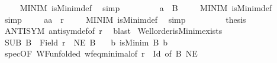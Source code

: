 \begin{isabellebody}
\ \ \ \isamarkupfalse%
\ MINIM{\isacharprime}{\kern0pt}\ isMinim{\isacharunderscore}{\kern0pt}def\ \isamarkupfalse%
\ simp\isanewline
\ \ \isacommand{{\isacharbraceright}{\kern0pt}}\isamarkupfalse%
\isanewline
\ \ \isamarkupfalse%
\isanewline
\ \ \isacommand{{\isacharbraceleft}{\kern0pt}}\isamarkupfalse%
\isamarkupfalse%
\ {\isachardoublequoteopen}a{\isacharprime}{\kern0pt}\ {\isasymin}\ B{\isachardoublequoteclose}\isanewline
\ \ \ \isamarkupfalse%
\ MINIM{\isacharprime}{\kern0pt}\ isMinim{\isacharunderscore}{\kern0pt}def\ \isamarkupfalse%
\ simp\isanewline
\ \ \ \isamarkupfalse%
\ {\isachardoublequoteopen}{\isacharparenleft}{\kern0pt}a{\isacharcomma}{\kern0pt}a{\isacharprime}{\kern0pt}{\isacharparenright}{\kern0pt}\ {\isasymin}\ r{\isachardoublequoteclose}\isanewline
\ \ \ \isamarkupfalse%
\ MINIM\ isMinim{\isacharunderscore}{\kern0pt}def\ \isamarkupfalse%
\ simp\isanewline
\ \ \isacommand{{\isacharbraceright}{\kern0pt}}\isamarkupfalse%
\isanewline
\ \ \isamarkupfalse%
\isanewline
\ \ \isamarkupfalse%
\ {\isacharquery}{\kern0pt}thesis\ \isamarkupfalse%
\ ANTISYM\ antisym{\isacharunderscore}{\kern0pt}def{\isacharbrackleft}{\kern0pt}of\ r{\isacharbrackright}{\kern0pt}\ \isamarkupfalse%
\ blast\isanewline
{}\isamarkupfalse%
%
\endisatagproof
{\isafoldproof}%
%
\isadelimproof
\isanewline
%
\endisadelimproof
\isanewline
{}\isamarkupfalse%
\ Well{\isacharunderscore}{\kern0pt}order{\isacharunderscore}{\kern0pt}isMinim{\isacharunderscore}{\kern0pt}exists{\isacharcolon}{\kern0pt}\isanewline
{}\ SUB{\isacharcolon}{\kern0pt}\ {\isachardoublequoteopen}B\ {\isasymle}\ Field\ r{\isachardoublequoteclose}\ \ NE{\isacharcolon}{\kern0pt}\ {\isachardoublequoteopen}B\ {\isasymnoteq}\ {\isacharbraceleft}{\kern0pt}{\isacharbraceright}{\kern0pt}{\isachardoublequoteclose}\isanewline
{}\ {\isachardoublequoteopen}{\isasymexists}b{\isachardot}{\kern0pt}\ isMinim\ B\ b{\isachardoublequoteclose}\isanewline
%
\isadelimproof
%
\endisadelimproof
%
\isatagproof
{}\isamarkupfalse%
{\isacharminus}{\kern0pt}\isanewline
\ \ \isamarkupfalse%
\ spec{\isacharbrackleft}{\kern0pt}OF\ WF{\isacharbrackleft}{\kern0pt}unfolded\ wf{\isacharunderscore}{\kern0pt}eq{\isacharunderscore}{\kern0pt}minimal{\isacharbrackleft}{\kern0pt}of\ {\isachardoublequoteopen}r\ {\isacharminus}{\kern0pt}\ Id{\isachardoublequoteclose}{\isacharbrackright}{\kern0pt}{\isacharbrackright}{\kern0pt}{\isacharcomma}{\kern0pt}\ of\ B{\isacharbrackright}{\kern0pt}\ NE\ \isamarkupfalse%

\end{isabellebody}
